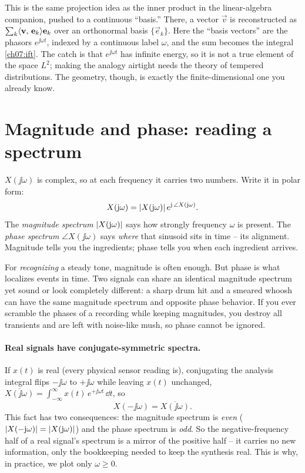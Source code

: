 \begin{connectionbox}
This is the same projection idea as the inner product in the linear-algebra companion,
pushed to a continuous ``basis.'' There, a vector $\vec v$ is reconstructed as
$\sum_k \langle \mathbf{v},\, \mathbf{e}_k \rangle\mathbf{e}_k$ over an orthonormal basis $\{\vec e_k\}$. Here
the ``basis vectors'' are the phasors $e^{\jj\omega t}$, indexed by a continuous label
$\omega$, and the sum becomes the integral \eqref{ch07:ift}. The catch is that
$e^{\jj\omega t}$ has infinite energy, so it is not a true element of the space $L^2$;
making the analogy airtight needs the theory of tempered distributions. The geometry,
though, is exactly the finite-dimensional one you already know.
\end{connectionbox}

\section{Magnitude and phase: reading a spectrum}
\label{ch07:mag-phase}

$X(\jj\omega)$ is complex, so at each frequency it carries two numbers. Write it in polar
form:
\begin{equation}
X(\mathrm{j}\omega) = \lvert X(\mathrm{j}\omega)\rvert\, e^{\mathrm{j}\,\angle X(\mathrm{j}\omega)} .
\end{equation}
The \emph{magnitude spectrum} $\lvert X(\mathrm{j}\omega)\rvert$ says how strongly frequency $\omega$ is
present. The \emph{phase spectrum} $\angle X(\jj\omega)$ says \emph{where} that sinusoid
sits in time -- its alignment. Magnitude tells you the ingredients; phase tells you when
each ingredient arrives.

\begin{trapbox}
For \emph{recognizing}
a steady tone, magnitude is often enough. But phase is what localizes events in time. Two
signals can share an identical magnitude spectrum yet sound or look completely different:
a sharp drum hit and a smeared whoosh can have the same magnitude spectrum and opposite
phase behavior. If you ever scramble the phases of a recording while keeping magnitudes,
you destroy all transients and are left with noise-like mush, so phase cannot be ignored.
\end{trapbox}

\paragraph{Real signals have conjugate-symmetric spectra.}
If $x(t)$ is real (every physical sensor reading is), conjugating the analysis integral flips $-\jj\omega$ to $+\jj\omega$ while leaving $x(t)$ unchanged, $\overline{X(\jj\omega)} = \int_{-\infty}^{\infty} x(t)\,e^{+\jj\omega t}\,\dd t$, so
\begin{equation}
\label{ch07:herm}
X(-\jj\omega) = \overline{X(\jj\omega)} .
\end{equation}
This fact has two consequences: the magnitude spectrum is
\emph{even} ($\lvert X(-\mathrm{j}\omega)\rvert = \lvert X(\mathrm{j}\omega)\rvert$) and the phase spectrum is
\emph{odd}. So the negative-frequency half of a real signal's spectrum is a mirror
of the positive half -- it carries no new information, only the bookkeeping needed to
keep the synthesis real. This is why, in practice, we plot only $\omega \ge 0$.

